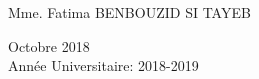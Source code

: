 \begin{titlepage}
\begin{center}
	 \begin{multicols}{}
			\Large 	Mme. Fatima BENBOUZID SI TAYEB\\
	\end{multicols}
	
	
	\small
	\vskip 0.5in
	Octobre 2018 \\
	Année Universitaire: 2018-2019\\
	
	\end{center}		
\restoregeometry
\end{titlepage}